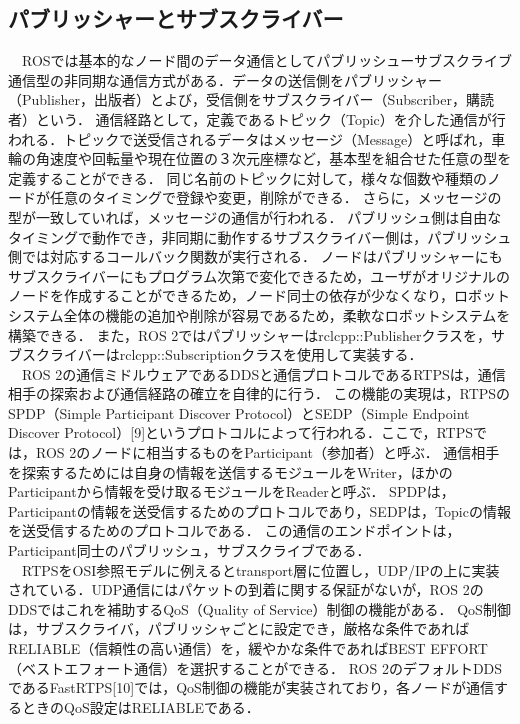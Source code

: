 \subsection{パブリッシャーとサブスクライバー}
　ROSでは基本的なノード間のデータ通信としてパブリッシューサブスクライブ通信型の非同期な通信方式がある．データの送信側をパブリッシャー（Publisher，出版者）とよび，受信側をサブスクライバー（Subscriber，購読者）という．
通信経路として，定義であるトピック（Topic）を介した通信が行われる．トピックで送受信されるデータはメッセージ（Message）と呼ばれ，車輪の角速度や回転量や現在位置の３次元座標など，基本型を組合せた任意の型を定義することができる．
同じ名前のトピックに対して，様々な個数や種類のノードが任意のタイミングで登録や変更，削除ができる．
さらに，メッセージの型が一致していれば，メッセージの通信が行われる．
パブリッシュ側は自由なタイミングで動作でき，非同期に動作するサブスクライバー側は，パブリッシュ側では対応するコールバック関数が実行される．
ノードはパブリッシャーにもサブスクライバーにもプログラム次第で変化できるため，ユーザがオリジナルのノードを作成することができるため，ノード同士の依存が少なくなり，ロボットシステム全体の機能の追加や削除が容易であるため，柔軟なロボットシステムを構築できる．
また，ROS 2ではパブリッシャーはrclcpp::Publisherクラスを，サブスクライバーはrclcpp::Subscriptionクラスを使用して実装する．
\\　ROS 2の通信ミドルウェアであるDDSと通信プロトコルであるRTPSは，通信相手の探索および通信経路の確立を自律的に行う．
この機能の実現は，RTPSのSPDP（Simple Participant Discover Protocol）とSEDP（Simple Endpoint Discover Protocol）[9]というプロトコルによって行われる．ここで，RTPSでは，ROS 2のノードに相当するものをParticipant（参加者）と呼ぶ．
通信相手を探索するためには自身の情報を送信するモジュールをWriter，ほかのParticipantから情報を受け取るモジュールをReaderと呼ぶ．
SPDPは，Participantの情報を送受信するためのプロトコルであり，SEDPは，Topicの情報を送受信するためのプロトコルである．
この通信のエンドポイントは，Participant同士のパブリッシュ，サブスクライブである．
\\　RTPSをOSI参照モデルに例えるとtransport層に位置し，UDP/IPの上に実装されている．UDP通信にはパケットの到着に関する保証がないが，ROS 2のDDSではこれを補助するQoS（Quality of Service）制御の機能がある．
QoS制御は，サブスクライバ，パブリッシャごとに設定でき，厳格な条件であればRELIABLE（信頼性の高い通信）を，緩やかな条件であればBEST EFFORT（ベストエフォート通信）を選択することができる．
ROS 2のデフォルトDDSであるFastRTPS[10]では，QoS制御の機能が実装されており，各ノードが通信するときのQoS設定はRELIABLEである．
